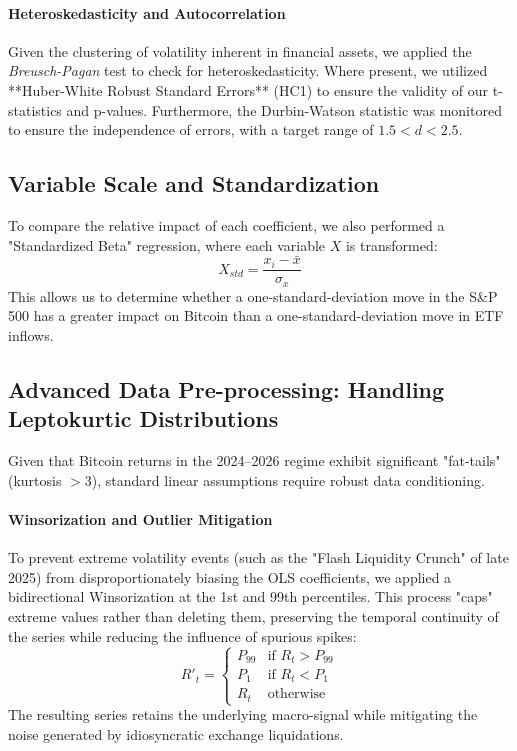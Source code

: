 \documentclass[10pt, conference, compsocconf]{IEEEtran}
\begin{document}
\paragraph{Heteroskedasticity and Autocorrelation}
Given the clustering of volatility inherent in financial assets, we applied the \textit{Breusch-Pagan} test to check for heteroskedasticity. Where present, we utilized **Huber-White Robust Standard Errors** (HC1) to ensure the validity of our t-statistics and p-values. Furthermore, the Durbin-Watson statistic was monitored to ensure the independence of errors, with a target range of $1.5 < d < 2.5$.

\subsection{Variable Scale and Standardization}
To compare the relative impact of each coefficient, we also performed a "Standardized Beta" regression, where each variable $X$ is transformed:
$$ X_{std} = \frac{x_i - \bar{x}}{\sigma_x} $$
This allows us to determine whether a one-standard-deviation move in the S\&P 500 has a greater impact on Bitcoin than a one-standard-deviation move in ETF inflows.

\subsection{Advanced Data Pre-processing: Handling Leptokurtic Distributions}

Given that Bitcoin returns in the 2024--2026 regime exhibit significant "fat-tails" (kurtosis $> 3$), standard linear assumptions require robust data conditioning. 

\paragraph{Winsorization and Outlier Mitigation}
To prevent extreme volatility events (such as the "Flash Liquidity Crunch" of late 2025) from disproportionately biasing the OLS coefficients, we applied a bidirectional Winsorization at the 1st and 99th percentiles. This process "caps" extreme values rather than deleting them, preserving the temporal continuity of the series while reducing the influence of spurious spikes:
\begin{equation}
R'_{t} = 
\begin{cases} 
P_{99} & \text{if } R_t > P_{99} \\
P_{1} & \text{if } R_t < P_{1} \\
R_t & \text{otherwise}
\end{cases}
\end{equation}
The resulting series retains the underlying macro-signal while mitigating the noise generated by idiosyncratic exchange liquidations.
\end{document}
